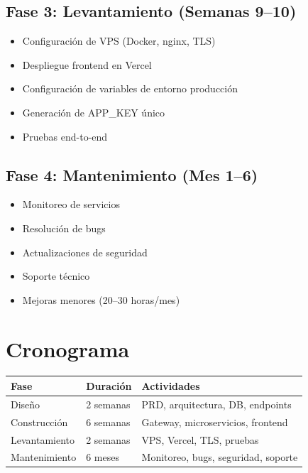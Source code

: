 \documentclass[11pt,a4paper]{article}
\begin{document}
\subsection{Fase 3: Levantamiento (Semanas 9--10)}
\begin{itemize}
    \item Configuración de VPS (Docker, nginx, TLS)
    \item Despliegue frontend en Vercel
    \item Configuración de variables de entorno producción
    \item Generación de APP\_KEY único
    \item Pruebas end-to-end
\end{itemize}

\subsection{Fase 4: Mantenimiento (Mes 1--6)}
\begin{itemize}
    \item Monitoreo de servicios
    \item Resolución de bugs
    \item Actualizaciones de seguridad
    \item Soporte técnico
    \item Mejoras menores (20--30 horas/mes)
\end{itemize}

\section{Cronograma}

\begin{tabularx}{\textwidth}{|l|l|X|}
\hline
\textbf{Fase} & \textbf{Duración} & \textbf{Actividades} \\
\hline
Diseño & 2 semanas & PRD, arquitectura, DB, endpoints \\
Construcción & 6 semanas & Gateway, microservicios, frontend \\
Levantamiento & 2 semanas & VPS, Vercel, TLS, pruebas \\
Mantenimiento & 6 meses & Monitoreo, bugs, seguridad, soporte \\
\hline
\end{tabularx}

\end{document}
